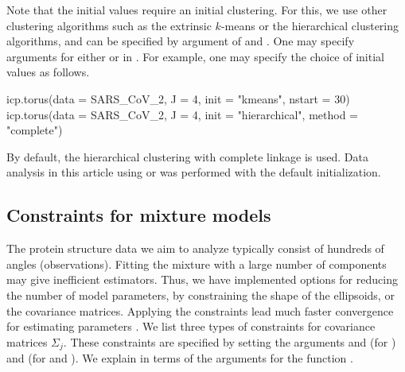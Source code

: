 Note that the initial values require an initial clustering. For this, we use other clustering algorithms such as the extrinsic $k$-means or the hierarchical clustering algorithms, and can be specified by argument  of  and . One may specify arguments for either  or  in . For example, one may specify the choice of initial values as follows.

\begin{example}
icp.torus(data = SARS_CoV_2, J = 4, init = "kmeans", nstart = 30) 
icp.torus(data = SARS_CoV_2, J = 4, init = "hierarchical", method = "complete")
\end{example}

By default, the hierarchical clustering with complete linkage is used. 
Data analysis in this article using  or  was performed with the default initialization.


\subsection{Constraints for mixture models}

The protein structure data we aim to analyze typically consist of hundreds of angles (observations). Fitting the mixture with a large number of components may give inefficient estimators. Thus, we have implemented options for reducing the number of model parameters, by constraining the shape of the ellipsoids, or the covariance matrices. Applying the constraints lead much faster convergence for estimating parameters \citep{grim2017approximation}. We list three types of constraints for covariance matrices $\Sigma_j$.
These constraints are specified by setting the arguments  and  (for ) and  (for  and ). We explain in terms of the arguments for the function .

